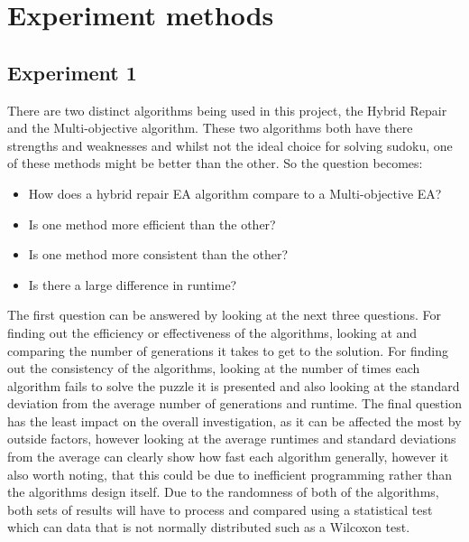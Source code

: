 \documentclass[a4paper,11pt]{article}
\begin{document}
\section{Experiment methods}

\subsection{Experiment 1}
There are two distinct algorithms being used in this project, the Hybrid Repair and the Multi-objective algorithm. These two algorithms both have there strengths and weaknesses and whilst not the ideal choice for solving sudoku, one of these methods might be better than the other. So the question becomes: 
\begin{itemize} 
     \item How does a hybrid repair EA algorithm compare to a Multi-objective EA? 
     \item Is one method more efficient than the other?
     \item Is one method more consistent than the other?
     \item Is there a large difference in runtime?
\end{itemize}
The first question can be answered by looking at the next three questions. For finding out the efficiency or effectiveness of the algorithms, looking at and comparing the number of generations it takes to get to the solution.  For finding out the consistency of the algorithms, looking at the number of times each algorithm fails to solve the puzzle it is presented and also looking at the standard deviation from the average number of generations and runtime. \newline \newline The final question has the least impact on the overall investigation, as it can be affected the most by outside factors, however looking at the average runtimes and standard deviations from the average can clearly show how fast each algorithm generally, however it also worth noting, that this could be due to inefficient programming rather than the algorithms design itself. Due to the randomness of both of the algorithms, both sets of results will have to process and compared using a statistical test which can data that is not normally distributed such as a Wilcoxon test.
\end{document}
